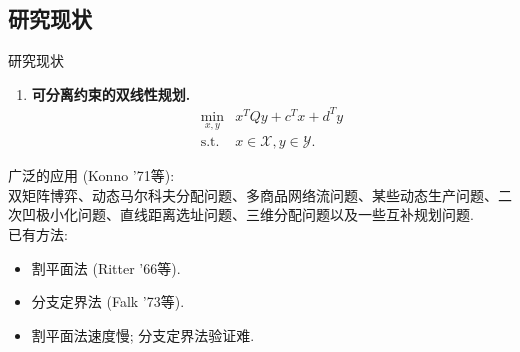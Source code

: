 \documentclass{beamer}
\newcommand{\tnewroman}{\fontspec{Times New Roman}}
\newcommand*{\red}[1]{\textcolor[rgb]{0.8,0.05,0.05}{#1}}
\newcommand*{\sfred}[1]{\red{\textsf{#1}}}
\newcommand{\st}{\mathrm{s.t.}}
\begin{document}
\subsection{研究现状}
\begin{frame}{研究现状}
\begin{enumerate}[角度1]
\item \textbf{可分离约束的双线性规划.}
$$
	\begin{array}{rl}
		\min\limits_{x,y} & x^TQy+c^Tx+d^Ty\\
		\st & x\in\mathcal{X},y\in\mathcal{Y}.
	\end{array}
$$
\end{enumerate}
广泛的应用 (\sfred{Konno '71}等):\\
双矩阵博弈、动态马尔科夫分配问题、多商品网络流问题、某些动态生产问题、二次凹极小化问题、直线距离选址问题、三维分配问题以及一些互补规划问题.\\[1em]
已有方法:
\begin{itemize}
\item 割平面法 (\sfred{Ritter '66}等).
\item 分支定界法 (\sfred{Falk '73}等).
\item 割平面法速度慢; 分支定界法验证难.
\end{itemize}
\end{frame}
\end{document}
